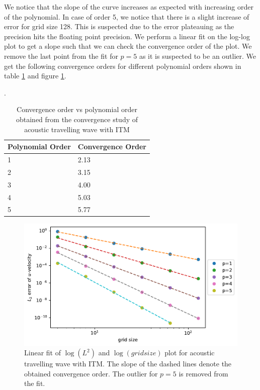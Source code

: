 We notice that the slope of the curve increases as expected with increasing order of the polynomial. In case of order 5, we notice that there is a slight increase
of error for grid size 128. This is suspected due to the error plateauing as the precision hits the floating point precision. We perform a linear fit on the log-log
plot to get a slope such that we can check the convergence order of the plot. We remove the last point from the fit for $p=5$ as it is suspected to be an outlier. 
We get the following convergence orders for different polynomial orders shown in table \ref{table:convergenceorder} and figure \ref{fig:convergenceorder}.

\begin{center}
\begin{table}[]
    \centering
    \caption{Convergence order vs polynomial order obtained from the convergence study of acoustic travelling wave with \ac{ITM}}.
    \label{table:convergenceorder}
    \begin{tabular}{|l|l|}
        \hline
     \textbf{Polynomial Order}& \textbf{Convergence Order}  \\
     \hline
     1 & 2.13\\
     \hline
     2 & 3.15 \\
     \hline
     3 & 4.00 \\
     \hline
     4 & 5.03 \\
        \hline
        5 & 5.77\\
        \hline
    \end{tabular}
    \end{table}
\end{center}

\begin{figure}
    \centering
    \includegraphics[width=\linewidth]{figures/error2.pdf}
    \caption{Linear fit of $\log\left(L^2\right)$ and $\log\left(grid size\right)$  plot for acoustic travelling wave with \ac{ITM}. The slope of the dashed lines denote the 
    obtained convergence order. The outlier for $p=5$ is removed from the fit.}
    \label{fig:convergenceorder}
\end{figure}

